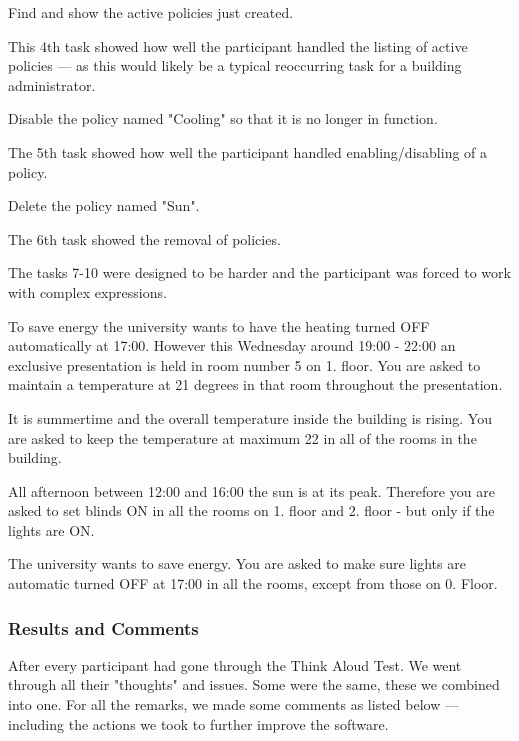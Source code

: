\begin{framed}
Find and show the active policies just created.
\end{framed}
This 4th task showed how well the participant handled the listing of active policies --- as this would likely be a typical reoccurring task for a building administrator.

\begin{framed}
Disable the policy named "Cooling" so that it is no longer in function.
\end{framed}
The 5th task showed how well the participant handled enabling/disabling of a policy.

\begin{framed}
Delete the policy named "Sun".
\end{framed}
The 6th task showed the removal of policies.

The tasks 7-10 were designed to be harder and the participant was forced to work with complex expressions.

\begin{framed}
To save energy the university wants to have the heating turned OFF automatically at 17:00. However this Wednesday around 19:00 - 22:00 an exclusive presentation is held in room number 5 on 1. floor.
You are asked to maintain a temperature at 21 degrees in that room throughout the presentation.
\end{framed}

\begin{framed}
It is summertime and the overall temperature inside the building is rising. You are asked to keep the temperature at maximum 22 in all of the rooms in the building.
\end{framed}

\begin{framed}
All afternoon between 12:00 and 16:00 the sun is at its peak. Therefore you are asked to set blinds ON in all the rooms on 1. floor and 2. floor - but only if the lights are ON.
\end{framed}

\begin{framed}
The university wants to save energy. You are asked to make sure lights are automatic turned OFF at 17:00 in all the rooms, except from those on 0. Floor.
\end{framed}

\subsubsection{Results and Comments}
\label{results-and-comments}
After every participant had gone through the Think Aloud Test. We went through all their "thoughts" and issues. Some were the same, these we combined into one.
For all the remarks, we made some comments as listed below --- including the actions we took to further improve the software.


